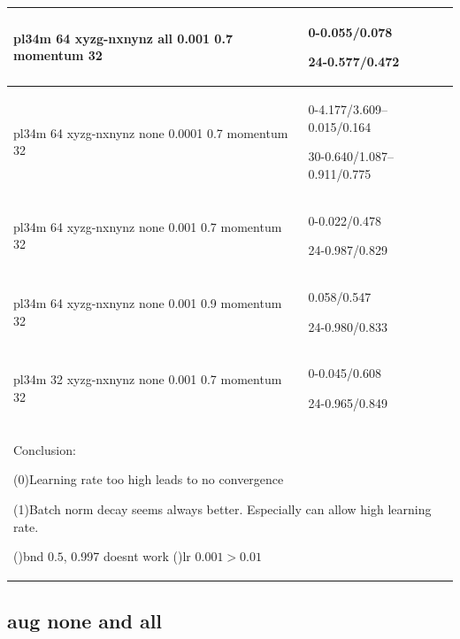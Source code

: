 \documentclass[,table,dvipsnames]{article}
\begin{document}
\begin{tabular}{|p{10cm}|p{5cm}| }
	pl34m 64 xyzg-nxnynz all 0.001 0.7 momentum 32 & 0-0.055/0.078\par 24-0.577/0.472\\	
	\hline
	
	pl34m 64 xyzg-nxnynz none 0.0001 0.7 momentum 32 & 0-4.177/3.609--0.015/0.164\par 30-0.640/1.087--0.911/0.775\\
	\hline 
	pl34m 64 xyzg-nxnynz none 0.001 0.7 momentum 32 & 0-0.022/0.478\par 24-0.987/0.829\\
	\hline
	pl34m 64 xyzg-nxnynz none 0.001 0.9 momentum 32 & 0.058/0.547\par 24-0.980/0.833\\
	\hline
	pl34m 32 xyzg-nxnynz none 0.001 0.7 momentum 32 & 0-0.045/0.608\par 24-0.965/0.849\\
	\hline
	
	\multicolumn{2}{|p{15cm}|}{ Conclusion:\par	
	(0)Learning rate too high leads to no convergence\par
	(1)Batch norm decay seems always better. Especially can allow high learning rate.\par
	()bnd $0.5$, 0.997 doesnt work
	()lr $0.001 > 0.01$  } \\
	\hline	
\end{tabular}

\subsection{aug none and all}
\end{document}
